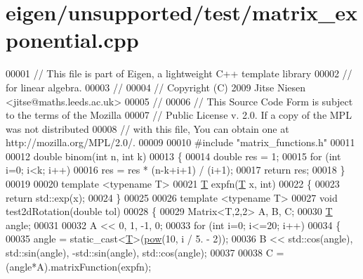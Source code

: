 \hypertarget{eigen_2unsupported_2test_2matrix__exponential_8cpp_source}{}\section{eigen/unsupported/test/matrix\+\_\+exponential.cpp}
\label{eigen_2unsupported_2test_2matrix__exponential_8cpp_source}

\begin{DoxyCode}
00001 \textcolor{comment}{// This file is part of Eigen, a lightweight C++ template library}
00002 \textcolor{comment}{// for linear algebra.}
00003 \textcolor{comment}{//}
00004 \textcolor{comment}{// Copyright (C) 2009 Jitse Niesen <jitse@maths.leeds.ac.uk>}
00005 \textcolor{comment}{//}
00006 \textcolor{comment}{// This Source Code Form is subject to the terms of the Mozilla}
00007 \textcolor{comment}{// Public License v. 2.0. If a copy of the MPL was not distributed}
00008 \textcolor{comment}{// with this file, You can obtain one at http://mozilla.org/MPL/2.0/.}
00009 
00010 \textcolor{preprocessor}{#include "matrix\_functions.h"}
00011 
00012 \textcolor{keywordtype}{double} binom(\textcolor{keywordtype}{int} n, \textcolor{keywordtype}{int} k)
00013 \{
00014   \textcolor{keywordtype}{double} res = 1;
00015   \textcolor{keywordflow}{for} (\textcolor{keywordtype}{int} i=0; i<k; i++)
00016     res = res * (n-k+i+1) / (i+1);
00017   \textcolor{keywordflow}{return} res;
00018 \}
00019 
00020 \textcolor{keyword}{template} <\textcolor{keyword}{typename} T>
00021 \hyperlink{group___sparse_core___module_class_eigen_1_1_triplet}{T} expfn(\hyperlink{group___sparse_core___module_class_eigen_1_1_triplet}{T} x, \textcolor{keywordtype}{int})
00022 \{
00023   \textcolor{keywordflow}{return} std::exp(x);
00024 \}
00025 
00026 \textcolor{keyword}{template} <\textcolor{keyword}{typename} T>
00027 \textcolor{keywordtype}{void} test2dRotation(\textcolor{keywordtype}{double} tol)
00028 \{
00029   Matrix<T,2,2> A, B, C;
00030   \hyperlink{group___sparse_core___module_class_eigen_1_1_triplet}{T} angle;
00031 
00032   A << 0, 1, -1, 0;
00033   \textcolor{keywordflow}{for} (\textcolor{keywordtype}{int} i=0; i<=20; i++)
00034   \{
00035     angle = \textcolor{keyword}{static\_cast<}\hyperlink{group___sparse_core___module_class_eigen_1_1_triplet}{T}\textcolor{keyword}{>}(\hyperlink{group___core___module_ab6dc101d82e8228a19a8840e3a29c1c9}{pow}(10, i / 5. - 2));
00036     B << std::cos(angle), std::sin(angle), -std::sin(angle), std::cos(angle);
00037 
00038     C = (angle*A).matrixFunction(expfn);

\end{DoxyCode}

